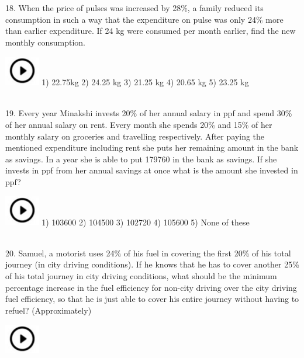 \documentclass{article}
\begin{document}
18. When the price of pulses was increased by 28\%, a family reduced its consumption in such a way that the expenditure on pulse was only 24\% more than earlier expenditure. If 24 kg were consumed per month earlier, find the new monthly consumption.

\noindent 

\noindent   \includegraphics*[width=0.60in, height=0.52in]{images/image1}  1) 22.75kg              2) 24.25 kg       3) 21.25 kg       4) 20.65 kg       5) 23.25 kg

\noindent 

\noindent 

\noindent \\
 19. Every year Minakshi invests 20\% of her annual salary in ppf and spend 30\% of her annual salary on rent. Every month she spends 20\% and 15\% of her monthly salary on groceries and travelling respectively. After paying the mentioned expenditure including rent she puts her remaining amount in the bank as savings. In a year she is able to put 179760 in the bank as savings. If she invests in ppf from her annual savings at once what is the amount she invested in ppf?

\noindent   \includegraphics*[width=0.60in, height=0.52in]{images/image1} 1) 103600                2) 104500         3) 102720         4) 105600         5) None of these

\noindent \\
20. Samuel, a motorist uses 24\% of his fuel in covering the first 20\% of his total journey (in city driving conditions). If he knows that he has to cover another 25\% of his total journey in city driving conditions, what should be the minimum percentage increase in the fuel efficiency for non-city driving over the city driving fuel efficiency, so that he is just able to cover his entire journey without having to refuel? (Approximately)


\noindent   \includegraphics*[width=0.60in, height=0.52in]{images/image1} 
\end{document}
